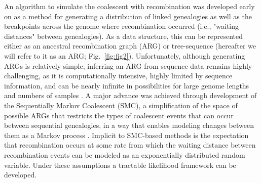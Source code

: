 \documentclass[11pt]{article}
\begin{document}
An algorithm to simulate the coalescent with recombination was developed 
early on 
\citep{hudson1983properties}
as a method for 
generating
a distribution of linked  
genealogies as well as the 
breakpoints across the genome where recombination occurred 
(i.e., "waiting distances" between genealogies).
As a data structure,
this can be represented either as an ancestral recombination graph (ARG)
\citep{griffiths_ancestral_1996} or tree-sequence \citep{kelleher2016efficient}
(hereafter we will refer to it as an ARG; Fig.~\ref{fig:fig2}).
Unfortunately, although generating ARGs is relatively simple, 
inferring an ARG from sequence data 
remains highly challenging, as it 
is computationally intensive, highly limited by 
sequence information, and can be nearly infinite in possibilities for large 
genome lengths and numbers of samples \citep{mcvean2005approximating}. 
A major advance was achieved through development of the Sequentially Markov 
Coalescent (SMC), a simplification of the space of possible ARGs that 
restricts the types of coalescent events that can occur between sequential
genealogies, in a way that enables modeling 
changes between
them as a Markov process 
\citep{mcvean2005approximating}. 
Implicit to SMC-based methods is the expectation that recombination occurs at 
some rate from which the waiting distance between recombination events can be modeled 
as an exponentially distributed random variable. 
Under these assumptions a tractable likelihood framework can be developed. 
\end{document}
